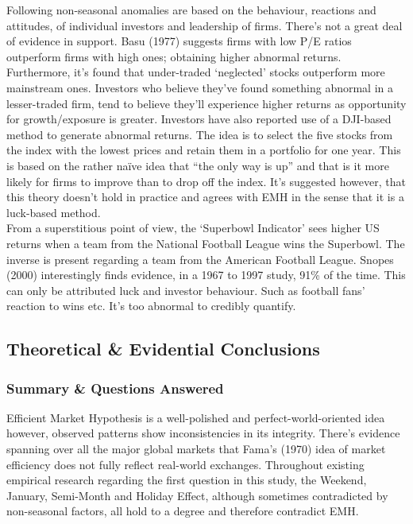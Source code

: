 \documentclass[11pt, english]{article}
\begin{document}
		Following non-seasonal anomalies are based on the behaviour, reactions and attitudes, of individual investors and leadership of firms. There’s not a great deal of evidence in support. Basu (1977) suggests firms with low P/E ratios outperform firms with high ones; obtaining higher abnormal returns. Furthermore, it’s found that under-traded `neglected' stocks outperform more mainstream ones. Investors who believe they’ve found something abnormal in a lesser-traded firm, tend to believe they’ll experience higher returns as opportunity for growth/exposure is greater. Investors have also reported use of a DJI-based method to generate abnormal returns. The idea is to select the five stocks from the index with the lowest prices and retain them in a portfolio for one year. This is based on the rather naïve idea that ``the only way is up'' and that is it more likely for firms to improve than to drop off the index. It’s suggested however, that this theory doesn’t hold in practice and agrees with EMH in the sense that it is a luck-based method.\\

		From a superstitious point of view, the `Superbowl Indicator' sees higher US returns when a team from the National Football League wins the Superbowl. The inverse is present regarding a team from the American Football League. Snopes (2000) interestingly finds evidence, in a 1967 to 1997 study, 91\% of the time. This can only be attributed luck and investor behaviour. Such as football fans' reaction to wins etc. It’s too abnormal to credibly quantify.

	\newpage

	\subsection{Theoretical \& Evidential Conclusions}

		\subsubsection{Summary \& Questions Answered}

		Efficient Market Hypothesis is a well-polished and perfect-world-oriented idea however, observed patterns show inconsistencies in its integrity. There’s evidence spanning over all the major global markets that Fama’s (1970) idea of market efficiency does not fully reflect real-world exchanges. Throughout existing empirical research regarding the first question in this study, the Weekend, January, Semi-Month and Holiday Effect, although sometimes contradicted by non-seasonal factors, all hold to a degree and therefore contradict EMH.
\end{document}
